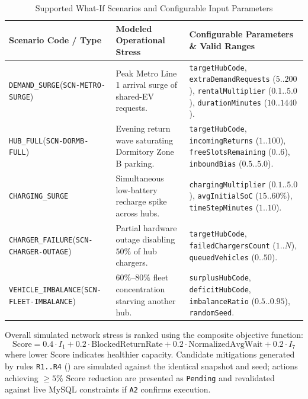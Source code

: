 \begin{table}[H]
  \centering
  \singlespacing\footnotesize
  \caption{Supported What-If Scenarios and Configurable Input Parameters}
  \label{tab:sim-scenarios}
  \renewcommand{\arraystretch}{1.22}
  \begin{tabularx}{\textwidth}{|L{3.9cm}|L{4.2cm}|Y|}
    \hline
    \textbf{Scenario Code / Type} & \textbf{Modeled Operational Stress} & \textbf{Configurable Parameters \& Valid Ranges} \\
    \hline
    \texttt{DEMAND\_SURGE}\newline(\texttt{SCN-METRO-SURGE}) & Peak Metro Line 1 arrival surge of shared-EV requests. & \texttt{targetHubCode}, \texttt{extraDemand\allowbreak Requests} ($5..200$), \texttt{rental\allowbreak Multiplier} ($0.1..5.0$), \texttt{duration\allowbreak Minutes} ($10..1440$). \\
    \hline
    \texttt{HUB\_FULL}\newline(\texttt{SCN-DORMB-FULL}) & Evening return wave saturating Dormitory Zone B parking. & \texttt{targetHubCode}, \texttt{incoming\allowbreak Returns} ($1..100$), \texttt{freeSlots\allowbreak Remaining} ($0..6$), \texttt{inboundBias} ($0.5..5.0$). \\
    \hline
    \texttt{CHARGING\_SURGE} & Simultaneous low-battery recharge spike across hubs. & \texttt{charging\allowbreak Multiplier} ($0.1..5.0$), \texttt{avgInitialSoC} ($15..60\%$), \texttt{timeStep\allowbreak Minutes} ($1..10$). \\
    \hline
    \texttt{CHARGER\_FAILURE}\newline(\texttt{SCN-CHARGER-OUTAGE}) & Partial hardware outage disabling $50\%$ of hub chargers. & \texttt{targetHubCode}, \texttt{failedChargers\allowbreak Count} ($1..N$), \texttt{queuedVehicles} ($0..50$). \\
    \hline
    \texttt{VEHICLE\_IMBALANCE}\newline(\texttt{SCN-FLEET-IMBALANCE}) & $60\%\text{--}80\%$ fleet concentration starving another hub. & \texttt{surplusHubCode}, \texttt{deficitHubCode}, \texttt{imbalance\allowbreak Ratio} ($0.5..0.95$), \texttt{randomSeed}. \\
    \hline
  \end{tabularx}
\end{table}

Overall simulated network stress is ranked using the composite objective function:
\begin{equation}
  \label{eq:sim-score}
  \text{Score} = 0.4 \cdot I_1 + 0.2 \cdot \text{BlockedReturnRate} + 0.2 \cdot \text{NormalizedAvgWait} + 0.2 \cdot I_7
\end{equation}
where lower $\text{Score}$ indicates healthier capacity. Candidate mitigations generated by rules \texttt{R1..R4} () are simulated against the identical snapshot and seed; actions achieving $\ge 5\%$ $\text{Score}$ reduction are presented as \texttt{Pending} and revalidated against live MySQL constraints if \texttt{A2} confirms execution.

